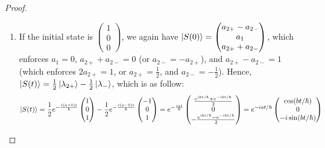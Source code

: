 \documentclass{article}
\begin{document}
\begin{proof}
\begin{enumerate}
        \item If the initial state is $\begin{pmatrix}
            1\\0\\0
        \end{pmatrix}$, we again have $\ket{S(0)} = \begin{pmatrix}
            a_{2+}-a_{2-}\\a_1\\a_{2+}+a_{2-}
        \end{pmatrix}$, which enforces $a_1=0$, $a_{2+}+a_{2-}=0$ (or $a_{2-}=-a_{2+}$), and $a_{2+}-a_{2-}=1$ (which enforces $2a_{2+}=1$, or $a_{2+}=\frac{1}{2}$, and $a_{2-}=-\frac{1}{2}$). Hence, $\ket{S(t)} = \frac{1}{2}\ket{\lambda_{2+}} - \frac{1}{2}\ket{\lambda_-}$, which is as follow:
        \begin{align}
            \ket{S(t)} = \frac{1}{2}e^{-\frac{i(a+b)t}{\hbar}}\begin{pmatrix}
                1\\0\\1
            \end{pmatrix} - \frac{1}{2}e^{-\frac{i(a-b)t}{\hbar}}\begin{pmatrix}
                -1\\0\\1
            \end{pmatrix} = e^{-\frac{iat}{\hbar}}\begin{pmatrix}
                \frac{e^{ibt/\hbar}+e^{-ibt/\hbar}}{2}\\0\\-\frac{e^{ibt/\hbar}-e^{-ibt/\hbar}}{2} 
            \end{pmatrix}= e^{-iat/\hbar}\begin{pmatrix}
                    \cos(bt/\hbar)\\0\\-i\sin(bt/\hbar)
                \end{pmatrix}
        \end{align}
    \end{enumerate}
\end{proof}
\end{document}

